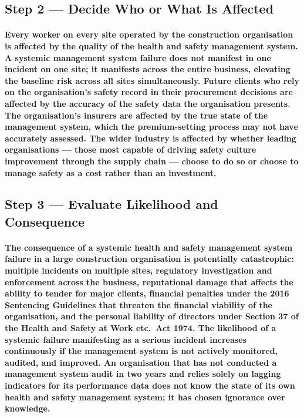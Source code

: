 \subsection{Step 2 --- Decide Who or What Is Affected}
\paragraph{Every worker on every site operated by the construction organisation is affected by the quality of the health and safety management system. A systemic management system failure does not manifest in one incident on one site; it manifests across the entire business, elevating the baseline risk across all sites simultaneously. Future clients who rely on the organisation's safety record in their procurement decisions are affected by the accuracy of the safety data the organisation presents. The organisation's insurers are affected by the true state of the management system, which the premium-setting process may not have accurately assessed. The wider industry is affected by whether leading organisations --- those most capable of driving safety culture improvement through the supply chain --- choose to do so or choose to manage safety as a cost rather than an investment.}

\subsection{Step 3 --- Evaluate Likelihood and Consequence}
\paragraph{The consequence of a systemic health and safety management system failure in a large construction organisation is potentially catastrophic: multiple incidents on multiple sites, regulatory investigation and enforcement across the business, reputational damage that affects the ability to tender for major clients, financial penalties under the 2016 Sentencing Guidelines that threaten the financial viability of the organisation, and the personal liability of directors under Section 37 of the Health and Safety at Work etc.\ Act 1974. The likelihood of a systemic failure manifesting as a serious incident increases continuously if the management system is not actively monitored, audited, and improved. An organisation that has not conducted a management system audit in two years and relies solely on lagging indicators for its performance data does not know the state of its own health and safety management system; it has chosen ignorance over knowledge.}

